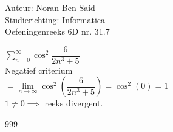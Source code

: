 \documentclass[a4paper]{article}
\begin{document}
\noindent \large Auteur: Noran Ben Said\\
\noindent \large Studierichting: Informatica \\
\noindent \large Oefeningenreeks 6D nr. 31.7\\

\medskip
\normalsize

$\displaystyle\sum_{n=0}^{\infty} \cos^2{\dfrac{6}{2n^3+5}}$\\

Negatief criterium\\

$= \lim\limits_{n \to \infty} \cos^2{\left(\dfrac{6}{2n^3+5}\right)} = \cos^2\left(0\right) = 1$ \\

$1 \neq 0 \implies$ reeks divergent.\\


\begin{thebibliography}{999}
\end{thebibliography}
\end{document}

